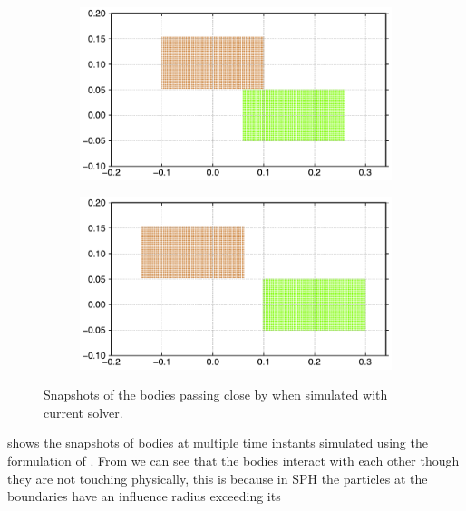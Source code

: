 \begin{figure}[!htpb]
  \begin{subfigure}{0.48\textwidth}
    \centering
    \includegraphics[width=1.0\textwidth]{figures/csph/figures/dinesh_2022_elastic_solids_passing_by/Mohseni_Vyas/time2}
    \label{fig:passing-2}
  \end{subfigure}
  \begin{subfigure}{0.48\textwidth}
    \centering
    \includegraphics[width=1.0\textwidth]{figures/csph/figures/dinesh_2022_elastic_solids_passing_by/Mohseni_Vyas/time3}
    \label{fig:passing-3}
  \end{subfigure}
  \caption{Snapshots of the bodies passing close by when simulated with current solver.}
\label{fig:dinesh-2022-passing-collision}
\end{figure}
%
 shows the snapshots of bodies at multiple
time instants simulated using the formulation of \textcite{adepu2021corrected}.
From  we can see that the bodies interact
with each other though they are not touching physically, this is because in
SPH the particles at the boundaries have an influence radius exceeding its
